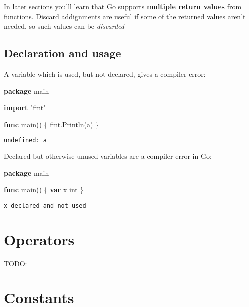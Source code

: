 \documentclass[]{book}
\newenvironment{Shaded}{\begin{snugshade}}{\end{snugshade}}
\newcommand{\DataTypeTok}[1]{\textcolor[rgb]{0.13,0.29,0.53}{#1}}
\newcommand{\KeywordTok}[1]{\textcolor[rgb]{0.13,0.29,0.53}{\textbf{#1}}}
\newcommand{\NormalTok}[1]{#1}
\newcommand{\StringTok}[1]{\textcolor[rgb]{0.31,0.60,0.02}{#1}}
\let\BeginKnitrBlock\begin \let\EndKnitrBlock\end
\begin{document}
\BeginKnitrBlock{rmdnote}
In later sections you'll learn that Go supports \textbf{multiple return values} from
functions. Discard addignments are useful if some of the returned values aren't
needed, so such values can be \emph{discarded}
\EndKnitrBlock{rmdnote}

\hypertarget{declaration-and-usage}{%
\subsection{Declaration and usage}\label{declaration-and-usage}}

A variable which is used, but not declared, gives a compiler error:

\begin{Shaded}
\begin{Highlighting}[]
\KeywordTok{package}\NormalTok{ main}

\KeywordTok{import} \StringTok{"fmt"}

\KeywordTok{func}\NormalTok{ main() \{}
\NormalTok{    fmt.Println(a)}
\NormalTok{\}}
\end{Highlighting}
\end{Shaded}

\begin{verbatim}
undefined: a
\end{verbatim}

Declared but otherwise unused variables are a compiler error in Go:

\begin{Shaded}
\begin{Highlighting}[]
\KeywordTok{package}\NormalTok{ main}

\KeywordTok{func}\NormalTok{ main() \{}
    \KeywordTok{var}\NormalTok{ x }\DataTypeTok{int}
\NormalTok{\}}
\end{Highlighting}
\end{Shaded}

\begin{verbatim}
x declared and not used
\end{verbatim}

\hypertarget{operators}{%
\section{Operators}\label{operators}}

TODO:

\hypertarget{constants}{%
\section{Constants}\label{constants}}
\end{document}
